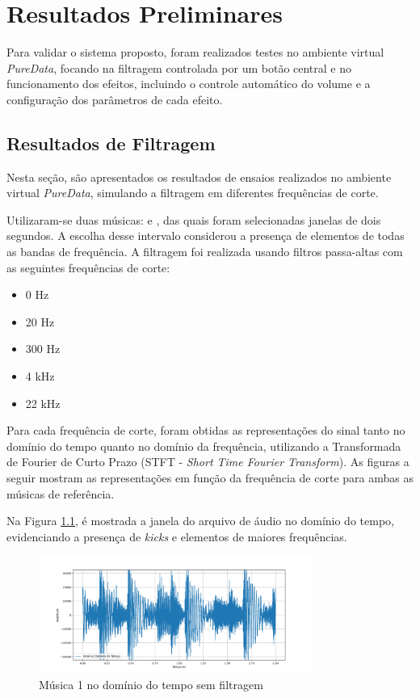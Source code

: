 \chapter[Resultados Preliminares]{Resultados Preliminares}
\label{sec:Resultados}

Para validar o sistema proposto, foram realizados testes no ambiente virtual \textit{PureData}, focando na filtragem controlada por um botão central e no funcionamento dos efeitos, incluindo o controle automático do volume e a configuração dos parâmetros de cada efeito.

\section{Resultados de Filtragem}

Nesta seção, são apresentados os resultados de ensaios realizados no ambiente virtual \textit{PureData}, simulando a filtragem em diferentes frequências de corte.

Utilizaram-se duas músicas: \cite{track01} e \cite{track02}, das quais foram selecionadas janelas de dois segundos. A escolha desse intervalo considerou a presença de elementos de todas as bandas de frequência. A filtragem foi realizada usando filtros passa-altas com as seguintes frequências de corte:

\begin{itemize}
    \item 0 Hz
    \item 20 Hz
    \item 300 Hz
    \item 4 kHz
    \item 22 kHz
\end{itemize}

Para cada frequência de corte, foram obtidas as representações do sinal tanto no domínio do tempo quanto no domínio da frequência, utilizando a Transformada de Fourier de Curto Prazo (STFT - \textit{Short Time Fourier Transform}). As figuras a seguir mostram as representações em função da frequência de corte para ambas as músicas de referência.

Na Figura \ref{fig40}, é mostrada a janela do arquivo de áudio no domínio do tempo, evidenciando a presença de \textit{kicks} e elementos de maiores frequências.

\begin{figure}[h]
    \centering
    \includegraphics[width=0.8\textwidth]{figuras/fig40.png}
    \caption{Música 1 no domínio do tempo sem filtragem}
    \label{fig40}
\end{figure}

